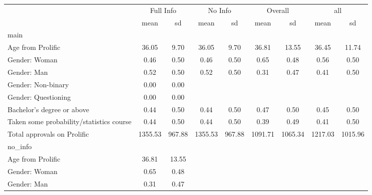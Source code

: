 {
\def\sym#1{\ifmmode^{#1}\else\(^{#1}\)\fi}
\begin{tabular}{l*{4}{cc}}
\hline\hline
                    &\multicolumn{2}{c}{Full Info}&\multicolumn{2}{c}{No Info}&\multicolumn{2}{c}{Overall}&\multicolumn{2}{c}{all}  \\
                    &        mean&          sd&        mean&          sd&        mean&          sd&        mean&          sd\\
\hline
main                &            &            &            &            &            &            &            &            \\
Age from Prolific   &       36.05&        9.70&       36.05&        9.70&       36.81&       13.55&       36.45&       11.74\\
Gender: Woman       &        0.46&        0.50&        0.46&        0.50&        0.65&        0.48&        0.56&        0.50\\
Gender: Man         &        0.52&        0.50&        0.52&        0.50&        0.31&        0.47&        0.41&        0.50\\
Gender: Non-binary  &        0.00&        0.00&            &            &            &            &            &            \\
Gender: Questioning &        0.00&        0.00&            &            &            &            &            &            \\
Bachelor's degree or above&        0.44&        0.50&        0.44&        0.50&        0.47&        0.50&        0.45&        0.50\\
Taken some probability/statistics course&        0.44&        0.50&        0.44&        0.50&        0.39&        0.49&        0.41&        0.50\\
Total approvals on Prolific&     1355.53&      967.88&     1355.53&      967.88&     1091.71&     1065.34&     1217.03&     1015.96\\
\hline
no\_info             &            &            &            &            &            &            &            &            \\
Age from Prolific   &       36.81&       13.55&            &            &            &            &            &            \\
Gender: Woman       &        0.65&        0.48&            &            &            &            &            &            \\
Gender: Man         &        0.31&        0.47&            &            &            &            &            &            \\

\end{tabular}}

